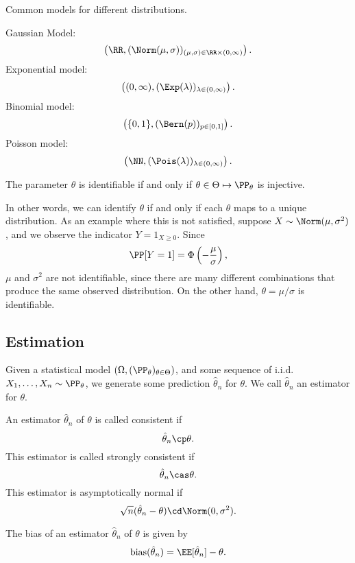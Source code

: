 \begin{example}
\exlabel

Common models for different distributions.
\end{example}
\noindent Gaussian Model: 
\[\left(\RR, (\Norm(\mu, \sigma))_{(\mu, \sigma)\in \RR\times (0,\infty)}\right).\]
Exponential model: 
\[\left((0, \infty), (\Exp(\lambda))_{\lambda\in (0,\infty)}\right).\]
Binomial model: 
\[\left(\{0,1\}, (\Bern(p))_{p\in [0,1]}\right).\]
Poisson model: 
\[\left(\NN, (\Pois(\lambda))_{\lambda\in (0, \infty)}\right).\]

\begin{definition}

The parameter $\theta$ is \ac{identifiable} if and only if $\theta\in \Theta\mapsto \PP_{\theta}$ is injective. 
\end{definition}

In other words, we can identify $\theta$ if and only if each $\theta$ maps to a unique distribution. As an example where this is not satisfied, suppose $X\sim \Norm(\mu, \sigma^2)$, and we observe the indicator $Y = 1_{X\geq 0}$. Since 
\[\PP[Y = 1] = \Phi\left(-\frac{\mu}{\sigma}\right),\]
$\mu$ and $\sigma^2$ are not identifiable, since there are many different combinations that produce the same observed distribution. On the other hand, $\theta = \mu/\sigma$ is identifiable. 

\subsection{Estimation}

Given a statistical model $(\Omega, (\PP_{\theta})_{\theta\in \Theta})$, and some sequence of i.i.d. $X_1, \hdots, X_n\sim \PP_{\theta}$, we generate some prediction $\hat{\theta}_n$ for $\theta$. We call $\hat{\theta}_n$ an \ac{estimator} for $\theta$.

\begin{definition}

An estimator $\hat{\theta}_n$ of $\theta$ is called \ac{consistent} if 
\[\hat{\theta}_n\cp \theta.\]
This estimator is called \ac{strongly consistent} if 
\[\hat{\theta}_n\cas \theta.\]
This estimator is \ac{asymptotically normal} if 
\[\sqrt{n}(\hat{\theta}_n-\theta)\cd \Norm(0,\sigma^2).\]
\end{definition}

\begin{definition}

The \ac{bias} of an estimator $\hat{\theta}_n$ of $\theta$ is given by 
\[\text{bias}(\hat{\theta}_n) = \EE[\hat{\theta}_n] - \theta.\]
\end{definition}

